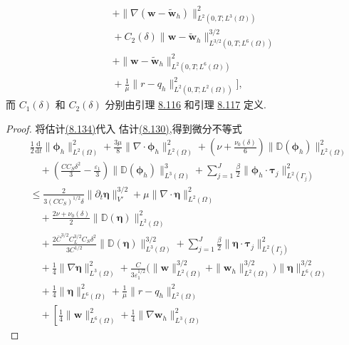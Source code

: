 \begin{theorem}[自然正则性下的一致有限元误差估计]
\[\begin{aligned}
&\quad+\|\nabla(\bm{w}-\widetilde{\bm{w}}_h)
       \|_{L^2(0,T;L^3(\Omega))}^2\\
&\quad+C_2(\delta)
       \|\bm{w}-\widetilde{\bm{w}}_h\|_{L^{3/2}(0,T;L^6(\Omega))}^{3/2}\\
&\quad+\|\bm{w}-\widetilde{\bm{w}}_h
       \|_{L^2(0,T;L^6(\Omega))}^2\\
&\quad+\frac1\mu\|r-q_h\|_{L^2(0,T;L^2(\Omega))}^2\Biggr],
\end{aligned}
\]
而 $C_1(\delta)$ 和 $C_2(\delta)$ 分别由引理
\hyperref[lem:smagorinsky-error-bracket-integrability]{8.116} 和引理
\hyperref[lem:smagorinsky-error-other-terms-integrability]{8.117} 定义.
\begin{proof}
将估计\hyperref[eq:smagorinsky-error-convection-estimate]{(8.134)}代入
估计\hyperref[eq:smagorinsky-error-differential-bound]{(8.130)},得到微分不等式
\begin{equation}\label{eq:smagorinsky-error-differential-inequality-139}
\begin{aligned}
&\frac12\frac{\mathrm{d}}{\mathrm{d}t}
       \|\symbf{\phi}_h\|_{L^2(\Omega)}^2
 +\frac{3\mu}{8}
       \|\nabla\cdot\symbf{\phi}_h\|_{L^2(\Omega)}^2
 +\left(\nu+\frac{\nu_0(\delta)}6\right)
       \|\mathbb{D}(\symbf{\phi}_h)\|_{L^2(\Omega)}^2\\
&\quad+\left(\frac{CC_S\delta^2}{3}-\frac{\varepsilon_1}{3}\right)
       \|\mathbb{D}(\symbf{\phi}_h)\|_{L^3(\Omega)}^3
 +\sum_{j=1}^J\frac\beta2
       \|\symbf{\phi}_h\cdot\symbf{\tau}_j\|_{L^2(\Gamma_j)}^2\\
&\le\frac{2}{3(CC_S)^{1/2}\delta}
       \|\partial_t\symbf{\eta}\|_{V'}^{3/2}
 +\mu\|\nabla\cdot\symbf{\eta}\|_{L^2(\Omega)}^2\\
&\quad+\frac{2\nu+\nu_0(\delta)}2
       \|\mathbb{D}(\symbf{\eta})\|_{L^2(\Omega)}^2\\
&\quad+\frac{2\overline C^{3/2}C_L^{3/2}C_S\delta^2}{3C^{1/2}}
       \|\mathbb{D}(\symbf{\eta})\|_{L^3(\Omega)}^{3/2}
 +\sum_{j=1}^J\frac\beta2
       \|\symbf{\eta}\cdot\symbf{\tau}_j\|_{L^2(\Gamma_j)}^2\\
&\quad+\frac14\|\nabla\symbf{\eta}\|_{L^3(\Omega)}^2
 +\frac{C}{3\varepsilon_1^{1/2}}
       \bigl(\|\bm{w}\|_{L^2(\Omega)}^{3/2}
             +\|\bm{w}_h\|_{L^2(\Omega)}^{3/2}\bigr)
       \|\symbf{\eta}\|_{L^6(\Omega)}^{3/2}\\
&\quad+\frac14\|\symbf{\eta}\|_{L^6(\Omega)}^2
 +\frac1\mu\|r-q_h\|_{L^2(\Omega)}^2\\
&\quad+\left[\frac14\|\bm{w}\|_{L^6(\Omega)}^2
 +\frac14\|\nabla\bm{w}_h\|_{L^3(\Omega)}^2

\end{aligned}
\end{equation}
\end{proof}
\end{theorem}
